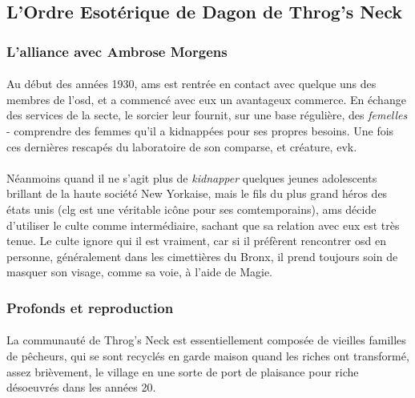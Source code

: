 \subsection{L'Ordre Esotérique de Dagon de Throg's Neck}

\subsubsection{L'alliance avec Ambrose Morgens}

\paragraph{} Au début des années 1930, \gls{ams} est rentrée en contact avec quelque uns des membres
de l'\gls{osd}, et a commencé avec eux un avantageux commerce. En échange des services de la secte, 
le sorcier leur fournit, sur une base régulière, des \emph{femelles} - comprendre des femmes qu'il a 
kidnappées pour ses propres besoins. Une fois ces dernières rescapés du laboratoire de son comparse, et 
créature, \gls{evk}.

\paragraph{} Néanmoins quand il ne s'agit plus de \emph{kidnapper} quelques jeunes adolescents brillant 
de la haute société New Yorkaise, mais le fils du plus grand héros des états unis (\gls{clg} est une véritable 
icône pour ses comtemporains), \gls{ams} décide d'utiliser le culte comme intermédiaire, sachant que sa 
relation avec eux est très tenue. Le culte ignore qui il est vraiment, car si il préfèrent rencontrer \gls{osd}
en personne, généralement dans les cimettières du Bronx, il prend toujours soin de masquer son visage, comme
sa voie, à l'aide de Magie.

\subsubsection{Profonds et reproduction}

\paragraph{} La communauté de Throg's Neck est essentiellement composée de vieilles familles de pêcheurs, 
qui se sont recyclés en garde maison quand les riches ont transformé, assez brièvement, le village en une
sorte de port de plaisance pour riche désoeuvrés dans les années 20.

